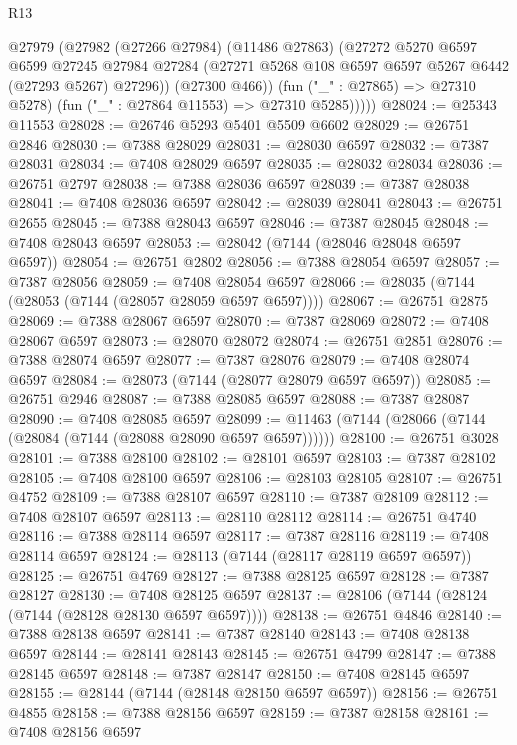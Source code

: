 \begin{lexlean}{R13}
\begin{coremodule}
          @27979
            (@27982
              (@27266 @27984)
              (@11486 @27863)
              (@27272
                @5270
                @6597
                @6599
                @27245
                @27984
                @27284
                (@27271 @5268 @108 @6597 @6597 @5267 @6442 (@27293 @5267) @27296))
              (@27300 @466))
            (fun ("_" : @27865) => @27310 @5278)
            (fun ("_" : @27864 @11553) => @27310 @5285)))))
@28024 := @25343 @11553
@28028 := @26746 @5293 @5401 @5509 @6602
@28029 := @26751 @2846
@28030 := @7388 @28029
@28031 := @28030 @6597
@28032 := @7387 @28031
@28034 := @7408 @28029 @6597
@28035 := @28032 @28034
@28036 := @26751 @2797
@28038 := @7388 @28036 @6597
@28039 := @7387 @28038
@28041 := @7408 @28036 @6597
@28042 := @28039 @28041
@28043 := @26751 @2655
@28045 := @7388 @28043 @6597
@28046 := @7387 @28045
@28048 := @7408 @28043 @6597
@28053 := @28042 (@7144 (@28046 @28048 @6597 @6597))
@28054 := @26751 @2802
@28056 := @7388 @28054 @6597
@28057 := @7387 @28056
@28059 := @7408 @28054 @6597
@28066 := @28035 (@7144 (@28053 (@7144 (@28057 @28059 @6597 @6597))))
@28067 := @26751 @2875
@28069 := @7388 @28067 @6597
@28070 := @7387 @28069
@28072 := @7408 @28067 @6597
@28073 := @28070 @28072
@28074 := @26751 @2851
@28076 := @7388 @28074 @6597
@28077 := @7387 @28076
@28079 := @7408 @28074 @6597
@28084 := @28073 (@7144 (@28077 @28079 @6597 @6597))
@28085 := @26751 @2946
@28087 := @7388 @28085 @6597
@28088 := @7387 @28087
@28090 := @7408 @28085 @6597
@28099 := @11463 (@7144 (@28066 (@7144 (@28084 (@7144 (@28088 @28090 @6597 @6597))))))
@28100 := @26751 @3028
@28101 := @7388 @28100
@28102 := @28101 @6597
@28103 := @7387 @28102
@28105 := @7408 @28100 @6597
@28106 := @28103 @28105
@28107 := @26751 @4752
@28109 := @7388 @28107 @6597
@28110 := @7387 @28109
@28112 := @7408 @28107 @6597
@28113 := @28110 @28112
@28114 := @26751 @4740
@28116 := @7388 @28114 @6597
@28117 := @7387 @28116
@28119 := @7408 @28114 @6597
@28124 := @28113 (@7144 (@28117 @28119 @6597 @6597))
@28125 := @26751 @4769
@28127 := @7388 @28125 @6597
@28128 := @7387 @28127
@28130 := @7408 @28125 @6597
@28137 := @28106 (@7144 (@28124 (@7144 (@28128 @28130 @6597 @6597))))
@28138 := @26751 @4846
@28140 := @7388 @28138 @6597
@28141 := @7387 @28140
@28143 := @7408 @28138 @6597
@28144 := @28141 @28143
@28145 := @26751 @4799
@28147 := @7388 @28145 @6597
@28148 := @7387 @28147
@28150 := @7408 @28145 @6597
@28155 := @28144 (@7144 (@28148 @28150 @6597 @6597))
@28156 := @26751 @4855
@28158 := @7388 @28156 @6597
@28159 := @7387 @28158
@28161 := @7408 @28156 @6597

\end{coremodule}
\end{lexlean}
